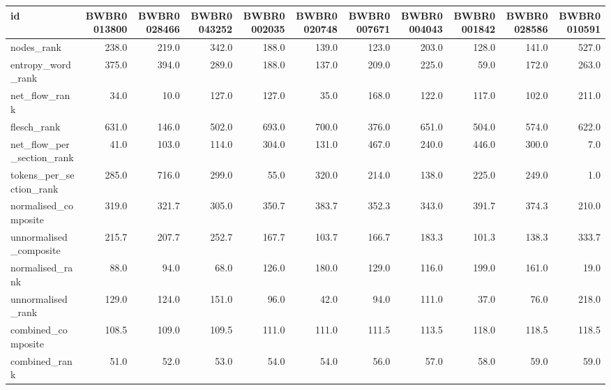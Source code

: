 \begin{tabular}{lrrrrrrrrrr}
\toprule
id & BWBR0013800 & BWBR0028466 & BWBR0043252 & BWBR0002035 & BWBR0020748 & BWBR0007671 & BWBR0004043 & BWBR0001842 & BWBR0028586 & BWBR0010591 \\
\midrule
nodes\_rank & 238.0 & 219.0 & 342.0 & 188.0 & 139.0 & 123.0 & 203.0 & 128.0 & 141.0 & 527.0 \\
\cline{1-11}
entropy\_word\_rank & 375.0 & 394.0 & 289.0 & 188.0 & 137.0 & 209.0 & 225.0 & 59.0 & 172.0 & 263.0 \\
\cline{1-11}
net\_flow\_rank & 34.0 & 10.0 & 127.0 & 127.0 & 35.0 & 168.0 & 122.0 & 117.0 & 102.0 & 211.0 \\
\cline{1-11}
flesch\_rank & 631.0 & 146.0 & 502.0 & 693.0 & 700.0 & 376.0 & 651.0 & 504.0 & 574.0 & 622.0 \\
\cline{1-11}
net\_flow\_per\_section\_rank & 41.0 & 103.0 & 114.0 & 304.0 & 131.0 & 467.0 & 240.0 & 446.0 & 300.0 & 7.0 \\
\cline{1-11}
tokens\_per\_section\_rank & 285.0 & 716.0 & 299.0 & 55.0 & 320.0 & 214.0 & 138.0 & 225.0 & 249.0 & 1.0 \\
\cline{1-11}
normalised\_composite & 319.0 & 321.7 & 305.0 & 350.7 & 383.7 & 352.3 & 343.0 & 391.7 & 374.3 & 210.0 \\
\cline{1-11}
unnormalised\_composite & 215.7 & 207.7 & 252.7 & 167.7 & 103.7 & 166.7 & 183.3 & 101.3 & 138.3 & 333.7 \\
\cline{1-11}
normalised\_rank & 88.0 & 94.0 & 68.0 & 126.0 & 180.0 & 129.0 & 116.0 & 199.0 & 161.0 & 19.0 \\
\cline{1-11}
unnormalised\_rank & 129.0 & 124.0 & 151.0 & 96.0 & 42.0 & 94.0 & 111.0 & 37.0 & 76.0 & 218.0 \\
\cline{1-11}
combined\_composite & 108.5 & 109.0 & 109.5 & 111.0 & 111.0 & 111.5 & 113.5 & 118.0 & 118.5 & 118.5 \\
\cline{1-11}
combined\_rank & 51.0 & 52.0 & 53.0 & 54.0 & 54.0 & 56.0 & 57.0 & 58.0 & 59.0 & 59.0 \\
\cline{1-11}
\bottomrule
\end{tabular}
